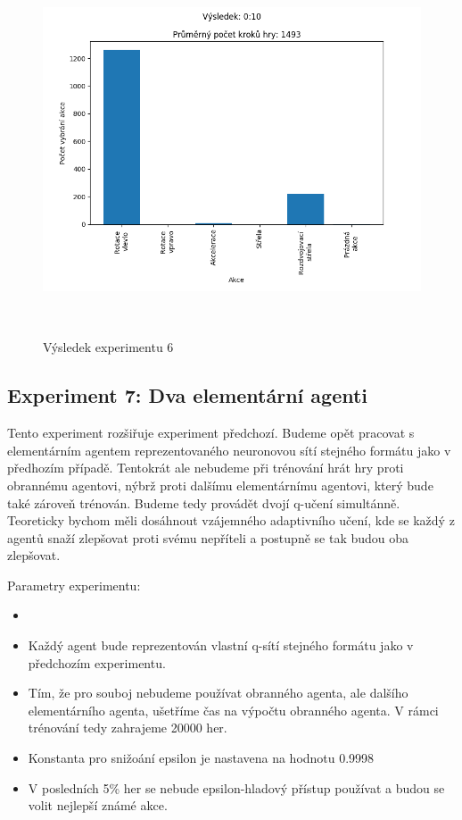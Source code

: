 \begin{figure}[p]\centering
\includegraphics[width=145mm, height=110mm]{./Obrazky/Experiment06Results.png}
\caption{Výsledek experimentu 6}
\label{Výsledek experimentu 06}
\end{figure}
    



\subsection{Experiment 7: Dva elementární agenti}
Tento experiment rozšiřuje experiment předchozí. Budeme opět pracovat s elementárním agentem reprezentovaného neuronovou sítí stejného formátu jako v předhozím případě.
Tentokrát ale nebudeme při trénování hrát hry proti obrannému agentovi, nýbrž proti dalšímu elementárnímu agentovi, který bude také zároveň trénován.
Budeme tedy provádět dvojí q-učení simultánně. Teoreticky bychom měli dosáhnout vzájemného adaptivního učení, kde se každý z agentů snaží zlepšovat proti svému nepříteli a postupně se tak budou oba zlepšovat.
\par


Parametry experimentu:
\begin{itemize}
    \item {}
    \item Každý agent bude reprezentován vlastní q-sítí stejného formátu jako v předchozím experimentu.
    \item Tím, že pro souboj nebudeme používat obranného agenta, ale dalšího elementárního agenta, ušetříme čas na výpočtu obranného agenta. V rámci trénování tedy zahrajeme 20000 her.  
    \item Konstanta pro snižoání epsilon je nastavena na hodnotu 0.9998
    \item V posledních 5\% her se nebude epsilon-hladový přístup používat a budou se volit nejlepší známé akce.
\end{itemize}



